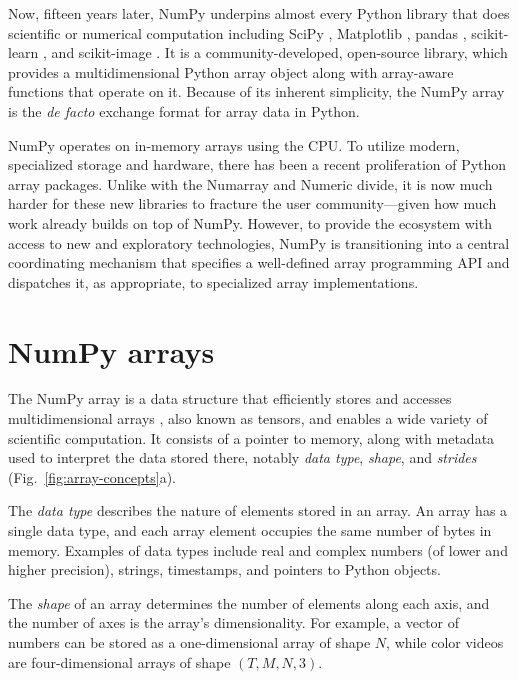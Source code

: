 \documentclass[twocolumn]{article}
\begin{document}
Now, fifteen years later, NumPy underpins almost every Python library that does scientific or
numerical computation \cite{dubois2007guest,oliphant2007python,millman2011python,perez2011python}
including SciPy \cite{virtanen2020scipy},
Matplotlib \cite{hunter2007matplotlib}, pandas \cite{mckinney-proc-scipy-2010},
scikit-learn \cite{pedregosa2011scikit}, and
scikit-image \cite{vanderwalt2014scikit}.
It is a community-developed, open-source library, which provides a
multidimensional Python array object along with array-aware functions
that operate on it.
Because of its inherent simplicity, the NumPy array is
the \emph{de facto} exchange format for array data in Python.

NumPy operates on in-memory arrays using the CPU. To utilize modern,
specialized storage and hardware, there has been a recent
proliferation of Python array packages. Unlike with the Numarray and
Numeric divide, it is now much harder for these new libraries to
fracture the user community---given how much work already builds
on top of NumPy.  However, to provide the ecosystem with access to
new and exploratory technologies, NumPy is transitioning into a
central coordinating mechanism that specifies a well-defined array
programming API and
dispatches it, as appropriate, to specialized array implementations.

\section*{NumPy arrays}

The NumPy array is a data structure that efficiently stores and accesses
multidimensional arrays \cite{vanderwalt2011numpy}, also known as tensors, and
enables a wide variety of scientific computation.
It consists of a pointer to memory, along with metadata used to interpret the
data stored there, notably {\em data type}, {\em shape}, and {\em strides}
(Fig.~\ref{fig:array-concepts}a).

The \emph{data type} describes the nature of elements stored in an array.
An array has a single data type, and each array element occupies the same
number of bytes in memory.
Examples of data types include real and complex numbers (of lower and higher
precision), strings, timestamps, and pointers to Python objects.

The \emph{shape} of an array determines the number of elements along each axis,
and the number of axes is the array's dimensionality.
For example, a vector of numbers can be stored as a one-dimensional array of
shape $N$, while color videos are four-dimensional arrays of shape
$(T, M, N, 3)$.
\end{document}
